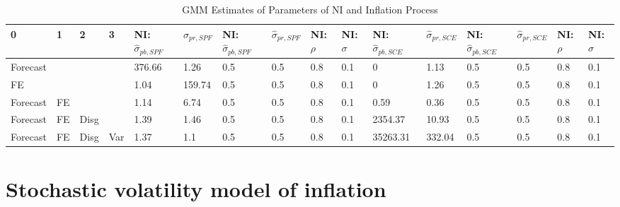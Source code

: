 \documentclass[]{article}
\begin{document}
\begin{table}
	\centering
	\caption{GMM Estimates of Parameters of NI and Inflation Process}
	\label{GMM_Est_NI_Table}
\begin{tabular}{llllllllllllllll}
	\hline 
	0        & 1  & 2    & 3   & NI: $\hat\sigma_{pb,SPF}$ & $\hat\sigma_{pr,SPF}$ & NI: $\hat\sigma_{pb,SPF}$ & $\hat\sigma_{pr,SPF}$ & NI: $\rho$ & NI: $\sigma$ & NI: $\hat\sigma_{pb,SCE}$ & $\hat\sigma_{pr,SCE}$ & NI: $\hat\sigma_{pb,SCE}$ & $\hat\sigma_{pr,SCE}$ & NI: $\rho$ & NI: $\sigma$ \\
	\hline 
	Forecast &    &      &     & 376.66                    & 1.26                  & 0.5                       & 0.5                   & 0.8        & 0.1          & 0                         & 1.13                  & 0.5                       & 0.5                   & 0.8        & 0.1          \\
	\hline 
	FE       &    &      &     & 1.04                      & 159.74                & 0.5                       & 0.5                   & 0.8        & 0.1          & 0                         & 1.26                  & 0.5                       & 0.5                   & 0.8        & 0.1          \\
	\hline 
	Forecast & FE &      &     & 1.14                      & 6.74                  & 0.5                       & 0.5                   & 0.8        & 0.1          & 0.59                      & 0.36                  & 0.5                       & 0.5                   & 0.8        & 0.1          \\
	\hline 
	Forecast & FE & Disg &     & 1.39                      & 1.46                  & 0.5                       & 0.5                   & 0.8        & 0.1          & 2354.37                   & 10.93                 & 0.5                       & 0.5                   & 0.8        & 0.1          \\
	\hline 
	Forecast & FE & Disg & Var & 1.37                      & 1.1                   & 0.5                       & 0.5                   & 0.8        & 0.1          & 35263.31                  & 332.04                & 0.5                       & 0.5                   & 0.8        & 0.1         \\
	\hline 
\end{tabular}
\end{table}

\section{Stochastic volatility model of inflation}
\end{document}
